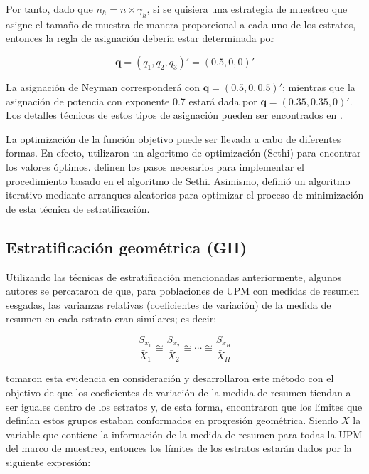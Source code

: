 \documentclass[
  12pt,
]{book}
\begin{document}
Por tanto, dado que \(n_h = n \times \gamma_h\), si se quisiera una estrategia de muestreo que asigne el tamaño de muestra de manera proporcional a cada uno de los estratos, entonces la regla de asignación debería estar determinada por

\[
\mathbf q = (q_1, q_2, q_3)' = (0.5, 0, 0)'
\]

La asignación de Neyman corresponderá con \(\mathbf q = (0.5, 0, 0.5)'\); mientras que la asignación de potencia con exponente 0.7 estará dada por \(\mathbf q = (0.35, 0.35, 0)'\). Los detalles técnicos de estos tipos de asignación pueden ser encontrados en \citet{Gutierrez_2016}.

La optimización de la función objetivo puede ser llevada a cabo de diferentes formas. En efecto, \citet{Lavallee_Hidiroglou_1988} utilizaron un algoritmo de optimización (Sethi) para encontrar los valores óptimos. \citet{Baillargeon_Rivest_Ferland_2007} definen los pasos necesarios para implementar el procedimiento basado en el algoritmo de Sethi. Asimismo, \citet{Kozak_2004} definió un algoritmo iterativo mediante arranques aleatorios para optimizar el proceso de minimización de esta técnica de estratificación.

\hypertarget{estratificaciuxf3n-geomuxe9trica-gh}{%
\subsection{Estratificación geométrica (GH)}\label{estratificaciuxf3n-geomuxe9trica-gh}}

Utilizando las técnicas de estratificación mencionadas anteriormente, algunos autores se percataron de que, para poblaciones de UPM con medidas de resumen sesgadas, las varianzas relativas (coeficientes de variación) de la medida de resumen en cada estrato eran similares; es decir:

\[
\frac{S_{x_1}}{\bar{X}_1} \cong \frac{S_{x_2}}{\bar{X}_2} \cong \cdots \cong\frac{S_{x_H}}{\bar{X}_H}  
\]

\citet{Gunning_Horgan_2004} tomaron esta evidencia en consideración y desarrollaron este método con el objetivo de que los coeficientes de variación de la medida de resumen tiendan a ser iguales dentro de los estratos y, de esta forma, encontraron que los límites que definían estos grupos estaban conformados en progresión geométrica. Siendo \(X\) la variable que contiene la información de la medida de resumen para todas la UPM del marco de muestreo, entonces los límites de los estratos estarán dados por la siguiente expresión:
\end{document}
